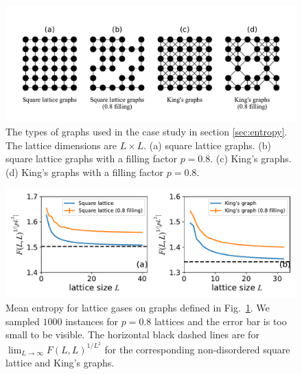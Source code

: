 \documentclass[onefignum, onetabnum]{siamart190516}
\newcommand{\<}{\langle}
\renewcommand{\>}{\rangle}
\newcommand{\Fig}[1]{Fig.~\ref{#1}}
\begin{document}
\begin{figure}[t] 
    \centering
    \includegraphics[width=\textwidth, trim={0cm 1cm 0cm 1cm}, clip]{figures/lattices.pdf}
    \caption{The types of graphs used in the case study in section \ref{sec:entropy}.
    The lattice dimensions are $L\times L$. (a) square lattice graphs. (b) square lattice graphs with a filling factor $p=0.8$.
    (c) King's graphs. (d) King's graphs with a filling factor $p=0.8$.}
    \label{fig:lattices}
\end{figure}

\begin{figure}[t] 
    \centering
    \includegraphics[width=\textwidth, trim={0cm 0cm 0cm 0cm}, clip]{figures/fig5.pdf}
    \caption{Mean entropy for lattice gases on graphs defined in \Fig{fig:lattices}.
    We sampled $1000$ instances for $p=0.8$ lattices and the error bar is too small to be visible.
    The horizontal black dashed lines are for $\lim_{L\rightarrow \infty} F(L,L)^{1/L^2}$ for the corresponding non-disordered square lattice and King's graphs.
    }
    \label{fig:hardsquare}
\end{figure}
\end{document}
